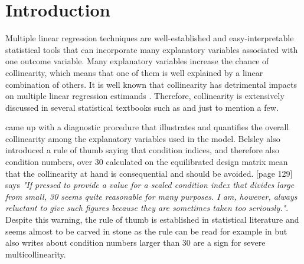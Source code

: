 \documentclass[11pt,a4paper,twoside]{book}\usepackage[]{graphicx}\usepackage[]{xcolor}
\begin{document}


\cleardoublepage
{}






\chapter{Introduction}

Multiple linear regression techniques are well-established and easy-interpretable statistical tools that can incorporate many explanatory variables associated with one outcome variable. Many explanatory variables increase the chance of collinearity, which means that one of them is well explained by a linear combination of others. It is well known that collinearity has detrimental impacts on multiple linear regression estimands \citep{Graham2003}.
Therefore, collinearity is extensively discussed in several statistical textbooks such as \cite{Cohen2013,Hocking2013,Neter1996,Tabachnick2012,Draper1998,Chatterjee2012,montgomery} and \cite{Belsley1991} just to mention a few.

\cite{Belsley1991} came up with a diagnostic procedure that illustrates and quantifies the overall collinearity among the explanatory variables used in the model. Belsley also introduced a rule of thumb saying that condition indices, and therefore also condition numbers, over 30 calculated on the equilibrated design matrix mean that the collinearity at hand is consequential and should be avoided.
\cite{Belsley1991}[page 129] says \textit{"If pressed to provide a value for a scaled condition index that divides large from small, 30 seems quite reasonable for many purposes. I am, however, always reluctant to give such figures because they are sometimes taken too seriously."}.
Despite this warning, the rule of thumb is established in statistical literature and seems almost to be carved in stone as the rule can be read for example in \cite{Cohen2013, Hocking2013, Tabachnick2012,Chatterjee2012} but also \cite{wiki_multicoll} writes about condition numbers larger than 30 are a sign for severe multicollinearity. 
\end{document}

